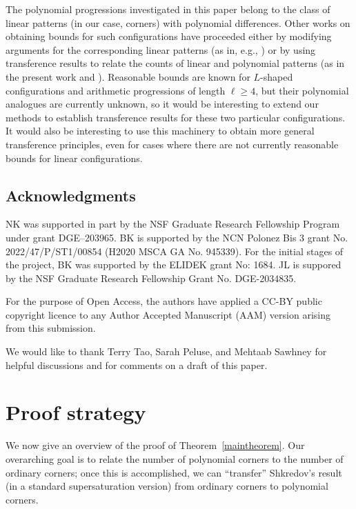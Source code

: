 \documentclass[11pt]{amsart}
\theoremstyle{definition}
\begin{document}
The polynomial progressions investigated in this paper belong to the class of linear patterns (in our case, corners) with polynomial differences. Other works on obtaining bounds for such configurations have proceeded either by modifying arguments for the corresponding linear patterns (as in, e.g., \cite{Pre17}) or by using transference results to relate the counts of linear and polynomial patterns (as in the present work and \cite{Kuc21a, PSS23}).  Reasonable bounds are known for $L$-shaped configurations and arithmetic progressions of length $\ell\geq 4$, but their polynomial analogues are currently unknown, so it would be interesting to extend our methods to establish transference results for these two particular configurations.  It would also be interesting to use this machinery to obtain more general transference principles, even for cases where there are not currently reasonable bounds for linear configurations.




\subsection{Acknowledgments} NK was supported in part by the NSF Graduate Research Fellowship Program under grant DGE–203965. BK is supported by the NCN Polonez Bis 3 grant No. 2022/47/P/ST1/00854 (H2020 MSCA GA No. 945339). For the initial stages of the project, BK was supported by the ELIDEK grant No: 1684.  JL is suppored by the NSF Graduate Research Fellowship Grant No. DGE-2034835. 

For the purpose of Open Access, the authors have applied a CC-BY public copyright licence to any Author Accepted Manuscript (AAM) version arising from this submission.

We would like to thank Terry Tao, Sarah Peluse, and Mehtaab Sawhney for helpful discussions and for comments on a draft of this paper.


\section{Proof strategy}\label{S: proof strategy}


We now give an overview of the proof of Theorem~\ref{maintheorem}. Our overarching goal is to relate the number of polynomial corners to the number of ordinary corners; once this is accomplished, we can ``transfer'' Shkredov's result (in a standard supersaturation version) from ordinary corners to polynomial corners. 
\end{document}
